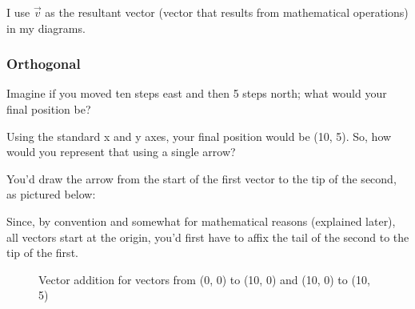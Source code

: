 \documentclass[12pt]{article}
\begin{document}
\begin{notebox}
    I use $\vec{v}$ as the resultant vector (vector that results from mathematical operations) in my diagrams.
\end{notebox}

\subsubsection{Orthogonal}

Imagine if you moved ten steps east and then 5 steps north; what would your final position be? 

Using the standard x and y axes, your final position would be (10, 5). So, how would you represent that using a single arrow?

You'd draw the arrow from the start of the first vector to the tip of the second, as pictured below:

\begin{notebox}[label={notebox:conventionreasons}]
    Since, by convention and somewhat for mathematical reasons (explained later), all vectors start at the origin, you'd first have to affix the tail of the second to the tip of the first.
\end{notebox}

\begin{figure}[H]
    \centering
    \caption{Vector addition for vectors from (0, 0) to (10, 0) and (10, 0) to (10, 5)}
\end{figure}
\end{document}
